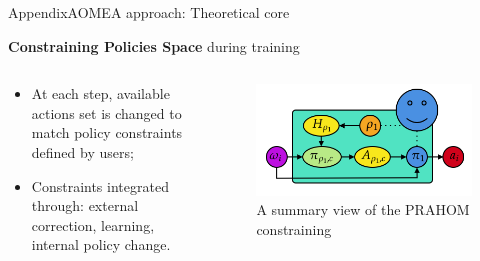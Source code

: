 \begin{frame}{Appendix}{AOMEA approach: Theoretical core}

    \textbf{Constraining Policies Space} during training

    \begin{columns}

        \begin{column}{0.3\textwidth}

            \begin{itemize}
                \item At each step, available actions set is changed to match policy constraints defined by users;
                \item Constraints integrated through: external correction, learning, internal policy change.
            \end{itemize}

        \end{column}

        \begin{column}{0.8\textwidth}
            \begin{figure}
                \centering
                \includegraphics[width=0.7\linewidth]{figures/prahom_training_constrain.png}
                \caption*{A summary view of the PRAHOM constraining}
                \label{fig:prahom_process}
            \end{figure}
        \end{column}

    \end{columns}

\end{frame}


